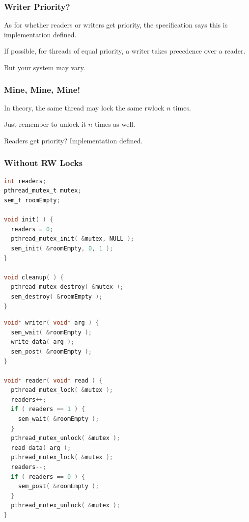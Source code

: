 \begin{frame}
	\frametitle{Writer Priority?}

	As for whether readers or writers get priority, the specification says this is implementation defined.

	If possible, for threads of equal priority, a writer takes precedence over a reader.

	But your system may vary.


\end{frame}



\begin{frame}
	\frametitle{Mine, Mine, Mine!}

	In theory, the same thread may lock the same rwlock $n$ times.

	Just remember to unlock it $n$ times as well.

	Readers get priority? Implementation defined.

\end{frame}


\begin{frame}[fragile]
	\frametitle{Without RW Locks}

	\begin{multicols}{2}
		\begin{lstlisting}[language=C]
int readers;
pthread_mutex_t mutex;
sem_t roomEmpty;

void init( ) {
  readers = 0;
  pthread_mutex_init( &mutex, NULL );
  sem_init( &roomEmpty, 0, 1 );
}

void cleanup( ) {
  pthread_mutex_destroy( &mutex );
  sem_destroy( &roomEmpty );
}
\end{lstlisting}

		\columnbreak

		\begin{lstlisting}[language=C]
void* writer( void* arg ) {
  sem_wait( &roomEmpty );
  write_data( arg );
  sem_post( &roomEmpty );
}

void* reader( void* read ) {
  pthread_mutex_lock( &mutex );
  readers++;
  if ( readers == 1 ) {
    sem_wait( &roomEmpty );
  }
  pthread_mutex_unlock( &mutex );
  read_data( arg );
  pthread_mutex_lock( &mutex );
  readers--;
  if ( readers == 0 ) {
    sem_post( &roomEmpty );
  }
  pthread_mutex_unlock( &mutex );
}
\end{lstlisting}

	\end{multicols}


\end{frame}


